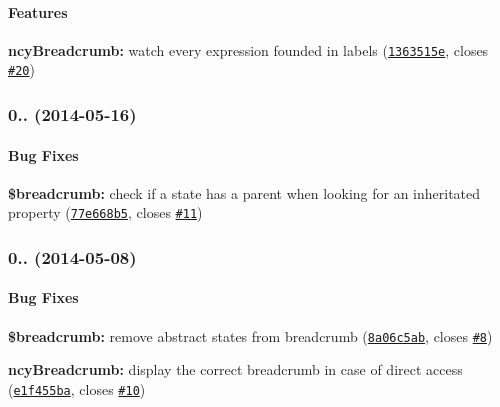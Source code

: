 {\bfseries \paragraph*{Features}}

{\bfseries }

{\bfseries 
\begin{DoxyItemize}
\item {\bfseries ncy\+Breadcrumb\+:} watch every expression founded in labels (\href{http://github.com/ncuillery/angular-breadcrumb/commit/1363515e20977ce2f39a1f5e5e1d701f0d7af296}{\tt 1363515e}, closes \href{http://github.com/ncuillery/angular-breadcrumb/issues/20}{\tt \#20})
\end{DoxyItemize}}

{\bfseries \label{_0.2.1}%
 \subsubsection*{0.. (2014-\/05-\/16)}}

{\bfseries }

{\bfseries \paragraph*{Bug Fixes}}

{\bfseries }

{\bfseries 
\begin{DoxyItemize}
\item {\bfseries \$breadcrumb\+:} check if a state has a parent when looking for an inheritated property (\href{http://github.com/ncuillery/angular-breadcrumb/commit/77e668b5eb759570a64c2a885e81580953af3201}{\tt 77e668b5}, closes \href{http://github.com/ncuillery/angular-breadcrumb/issues/11}{\tt \#11})
\end{DoxyItemize}}

{\bfseries \label{_0.2.0}%
 \subsubsection*{0.. (2014-\/05-\/08)}}

{\bfseries }

{\bfseries \paragraph*{Bug Fixes}}

{\bfseries }

{\bfseries 
\begin{DoxyItemize}
\item {\bfseries \$breadcrumb\+:} remove abstract states from breadcrumb (\href{http://github.com/ncuillery/angular-breadcrumb/commit/8a06c5abce749027d48f7309d1aabea1e447dfd5}{\tt 8a06c5ab}, closes \href{http://github.com/ncuillery/angular-breadcrumb/issues/8}{\tt \#8})
\item {\bfseries ncy\+Breadcrumb\+:} display the correct breadcrumb in case of direct access (\href{http://github.com/ncuillery/angular-breadcrumb/commit/e1f455ba4def97d3fc76b53772867b5f9daf4232}{\tt e1f455ba}, closes \href{http://github.com/ncuillery/angular-breadcrumb/issues/10}{\tt \#10})
\end{DoxyItemize}}

